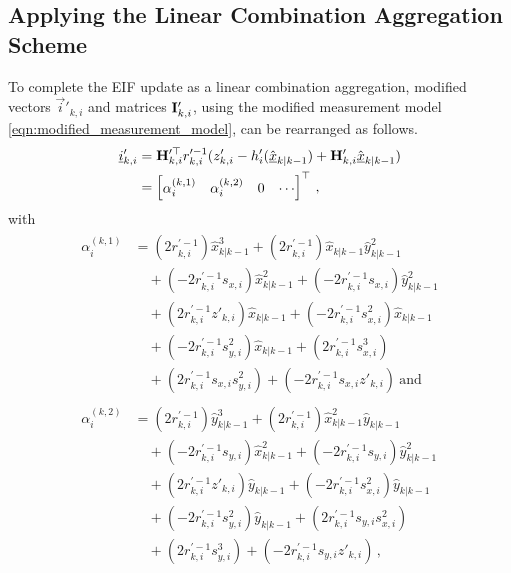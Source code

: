 \subsection{Applying the Linear Combination Aggregation Scheme}\label{subsec:nonlin_fusion:applying_lca_scheme}
To complete the EIF update as a linear combination aggregation, modified vectors $\vec{i}'_{k,i}$ and matrices ${{\mathbf{I}}}'_{k,i}$, using the modified measurement model \eqref{eqn:modified_measurement_model}, can be rearranged as follows.
\begin{equation}
    \begin{split}
        {\underline{i}}'_{k,i} &= {{\mathbf{H}}}_{k,i}^{\prime\top} r_{k,i}^{\prime-1}(z'_{k,i} - h'_i(\hat{{\underline{x}}}_{k|k-1}) + {{\mathbf{H}}}'_{k,i}\hat{{\underline{x}}}_{k|k-1}) \\
        &= 
        \begin{bmatrix}
            \alpha_i^{(k,1)} & \alpha_i^{(k,2)} & 0 & \cdots
        \end{bmatrix}^\top\,,
    \end{split} \label{eqn:hrz_linear_comb}
\end{equation}
with
\begin{align*}
    \begin{split}
        \alpha_i^{(k,1)} &= (2r_{k,i}^{\prime-1})\hat{x}_{k|k-1}^3 + (2r_{k,i}^{\prime-1})\hat{x}_{k|k-1}\hat{y}_{k|k-1}^2 \\
        &\quad+ (-2r_{k,i}^{\prime-1}s_{x,i})\hat{x}_{k|k-1}^2 + (-2r_{k,i}^{\prime-1}s_{x,i})\hat{y}_{k|k-1}^2 \\
        &\quad+ (2r_{k,i}^{\prime-1}z'_{k,i})\hat{x}_{k|k-1} + (-2r_{k,i}^{\prime-1}s_{x,i}^2)\hat{x}_{k|k-1}\\
        &\quad+ (-2r_{k,i}^{\prime-1}s_{y,i}^2)\hat{x}_{k|k-1} + (2r_{k,i}^{\prime-1}s_{x,i}^3) \\
        &\quad+ (2r_{k,i}^{\prime-1}s_{x,i}s_{y,i}^2) + (-2r_{k,i}^{\prime-1}s_{x,i} z'_{k,i})\ \textrm{and}
    \end{split}\\
    \begin{split}
        \alpha_i^{(k,2)} &= (2r_{k,i}^{\prime-1})\hat{y}_{k|k-1}^3 + (2r_{k,i}^{\prime-1})\hat{x}_{k|k-1}^2\hat{y}_{k|k-1} \\
        &\quad+ (-2r_{k,i}^{\prime-1}s_{y,i})\hat{x}_{k|k-1}^2 + (-2r_{k,i}^{\prime-1}s_{y,i})\hat{y}_{k|k-1}^2 \\
        &\quad+ (2r_{k,i}^{\prime-1}z'_{k,i})\hat{y}_{k|k-1} + (-2r_{k,i}^{\prime-1}s_{x,i}^2)\hat{y}_{k|k-1} \\
        &\quad+ (-2r_{k,i}^{\prime-1}s_{y,i}^2)\hat{y}_{k|k-1} + (2r_{k,i}^{\prime-1}s_{y,i}s_{x,i}^2) \\
        &\quad+ (2r_{k,i}^{\prime-1}s_{y,i}^3) + (-2r_{k,i}^{\prime-1}s_{y,i}z'_{k,i})\,,
    \end{split}
\end{align*}
